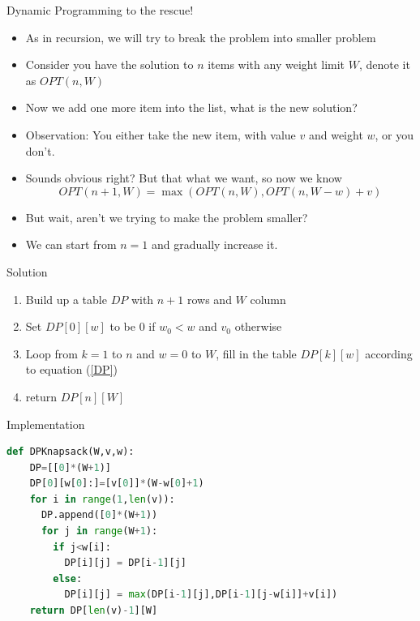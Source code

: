 \documentclass[10pt,xcolor={table,dvipsnames},t]{beamer}
\begin{document}
\begin{frame}{Dynamic Programming to the rescue!}
  \begin{itemize}
    \item As in recursion, we will try to break the problem into smaller problem
    \item Consider you have the solution to $n$ items with any weight limit $W$, denote it as $OPT(n,W)$
    \item Now we add one more item into the list, what is the new solution?
    \item Observation: You either take the new item, with value $v$ and weight $w$, or you don't.
    \item Sounds obvious right? But that what we want, so now we know
    \begin{equation}
      OPT(n+1,W) = \max(OPT(n,W),OPT(n,W-w)+v)\label{DP}
    \end{equation}
    \item But wait, aren't we trying to make the problem smaller?
    \item We can start from $n=1$ and gradually increase it.
  \end{itemize}
\end{frame}

\begin{frame}{Solution}
  \begin{enumerate}
    \item Build up a table $DP$ with $n+1$ rows and $W$ column
    \item Set $DP[0][w]$ to be $0$ if $w_0<w$ and $v_0$ otherwise
    \item Loop from $k=1$ to $n$ and $w=0$ to $W$, fill in the table $DP[k][w]$ according to equation (\ref{DP})
    \item return $DP[n][W]$
  \end{enumerate}
\end{frame}

\begin{frame}[fragile]{Implementation}
\begin{lstlisting}[language=python]
  def DPKnapsack(W,v,w):
    DP=[[0]*(W+1)]
    DP[0][w[0]:]=[v[0]]*(W-w[0]+1)
    for i in range(1,len(v)):
      DP.append([0]*(W+1))
      for j in range(W+1):
        if j<w[i]:
          DP[i][j] = DP[i-1][j]
        else:
          DP[i][j] = max(DP[i-1][j],DP[i-1][j-w[i]]+v[i])
    return DP[len(v)-1][W]
\end{lstlisting}
\end{frame}
\end{document}
